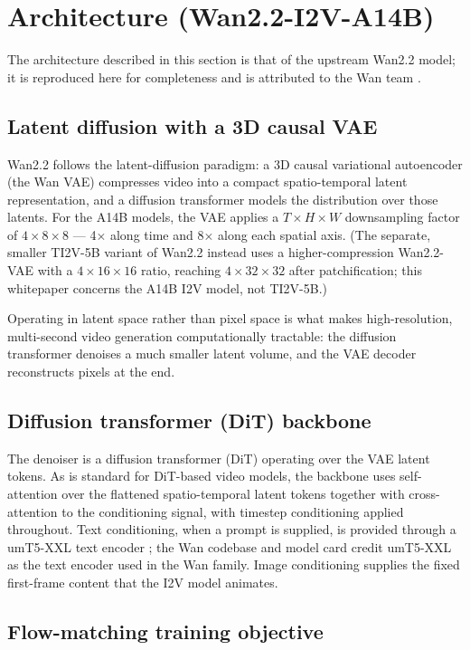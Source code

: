 \documentclass[11pt,a4paper]{article}
\begin{document}
\section{Architecture (Wan2.2-I2V-A14B)}

The architecture described in this section is that of the upstream Wan2.2 model; it is reproduced here for completeness and is attributed to the Wan team \cite{wan22repo,wan22hf}.

\subsection{Latent diffusion with a 3D causal VAE}

Wan2.2 follows the latent-diffusion paradigm: a 3D causal variational autoencoder (the Wan VAE) compresses video into a compact spatio-temporal latent representation, and a diffusion transformer models the distribution over those latents. For the A14B models, the VAE applies a $T\times H\times W$ downsampling factor of $4\times 8\times 8$ --- 4$\times$ along time and 8$\times$ along each spatial axis. (The separate, smaller TI2V-5B variant of Wan2.2 instead uses a higher-compression Wan2.2-VAE with a $4\times 16\times 16$ ratio, reaching $4\times 32\times 32$ after patchification; this whitepaper concerns the A14B I2V model, not TI2V-5B.)

Operating in latent space rather than pixel space is what makes high-resolution, multi-second video generation computationally tractable: the diffusion transformer denoises a much smaller latent volume, and the VAE decoder reconstructs pixels at the end.

\subsection{Diffusion transformer (DiT) backbone}

The denoiser is a diffusion transformer (DiT) \cite{dit} operating over the VAE latent tokens. As is standard for DiT-based video models, the backbone uses self-attention over the flattened spatio-temporal latent tokens together with cross-attention to the conditioning signal, with timestep conditioning applied throughout. Text conditioning, when a prompt is supplied, is provided through a umT5-XXL text encoder \cite{umt5}; the Wan codebase and model card credit umT5-XXL as the text encoder used in the Wan family. Image conditioning supplies the fixed first-frame content that the I2V model animates.

\subsection{Flow-matching training objective}
\end{document}
